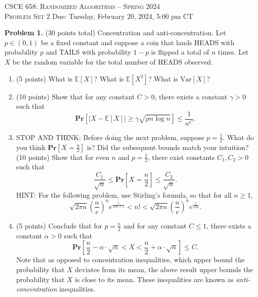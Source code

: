 \documentclass[11pt]{article}
\newcommand{\Ex}[1]{\ensuremath{\mathbb{E}\left[#1\right]}}
\newcommand{\Var}[1]{\ensuremath{\text{Var}\left[#1\right]}}
\newcommand{\PPr}[1]{\ensuremath{\mathbf{Pr}\left[#1\right]}}
\begin{document}
\begin{center}
{\Large\textsc{CSCE 658: Randomized Algorithms -- Spring 2024 \\ 
Problem Set 2}}
\vskip 0.1in
Due: Tuesday, February 20, 2024, 5:00 pm CT
\end{center}

\noindent
\textbf{Problem 1.} (30 points total)
Concentration and anti-concentration.
\vskip 0.1in\noindent
Let $p\in(0,1)$ be a fixed constant and suppose a coin that lands HEADS with probability $p$ and TAILS with probability $1-p$ is flipped a total of $n$ times. Let $X$ be the random variable for the total number of HEADS observed. 
\begin{enumerate}
\item (5 points)
What is $\Ex{X}$? What is $\Ex{X^2}$? What is $\Var{X}$?
\item (10 points)
Show that for any constant $C>0$, there exists a constant $\gamma>0$ such that 
\[\PPr{|X-\Ex{X}|\ge\gamma\sqrt{pn\log n}}\le\frac{1}{n^C}.\]
\item
STOP AND THINK: Before doing the next problem, suppose $p=\frac{1}{2}$. What do you think $\PPr{X=\frac{n}{2}}$ is? Did the subsequent bounds match your intuition?
\vskip 0.1in\noindent (10 points)
Show that for even $n$ and $p=\frac{1}{2}$, there exist constants $C_1,C_2>0$ such that
\[\frac{C_1}{\sqrt{n}}\le\PPr{X=\frac{n}{2}}\le\frac{C_2}{\sqrt{n}}.\]
\vskip 0.1in\noindent
HINT: For the following problem, use Stirling's formula, so that for all $n\ge 1$,
\[\sqrt{2\pi n}\left(\frac{n}{e}\right)^n e^{\frac{1}{12n+1}}<n!<\sqrt{2\pi n}\left(\frac{n}{e}\right)^n e^{\frac{1}{12n}}.\]
\item (5 points)
Conclude that for $p=\frac{n}{2}$ and for any constant $C\le 1$, there exists a constant $\alpha>0$ such that
\[\PPr{\frac{n}{2}-\alpha\cdot\sqrt{n}<X<\frac{n}{2}+\alpha\cdot\sqrt{n}}\le C.\]
Note that as opposed to concentration inequalities, which upper bound the probability that $X$ deviates from its mean, the above result upper bounds the probability that $X$ is close to its mean. These inequalities are known as \emph{anti-concentration} inequalities. 
\end{enumerate}
\end{document}
